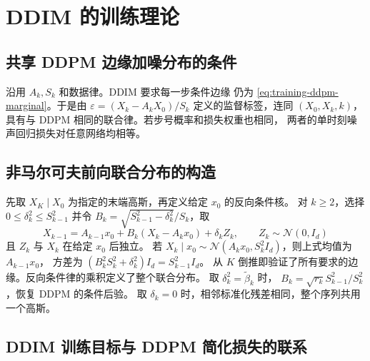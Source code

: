 \section{DDIM 的训练理论}
\label{sec:training-ddim}

\subsection{共享 DDPM 边缘加噪分布的条件}

沿用 \(A_k,S_k\) 和数据律。DDIM \cite{song2021ddim} 要求每一步条件边缘
仍为 \eqref{eq:training-ddpm-marginal}。于是由
\(\varepsilon=(X_k-A_kX_0)/S_k\) 定义的监督标签，连同
\((X_0,X_k,k)\)，具有与 DDPM 相同的联合律。若步号概率和损失权重也相同，
两者的单时刻噪声回归损失对任意网络均相等。

\subsection{非马尔可夫前向联合分布的构造}

先取 \(X_K\mid X_0\) 为指定的末端高斯，再定义给定 \(x_0\) 的反向条件核。
对 \(k\ge2\)，选择 \(0\le\delta_k^2\le S_{k-1}^2\) 并令
\(B_k=\sqrt{S_{k-1}^2-\delta_k^2}/S_k\)，取
\begin{equation}
  X_{k-1}=A_{k-1}x_0+B_k(X_k-A_kx_0)+\delta_k Z_k,
  \qquad Z_k\sim\mathcal N(0,I_d)
  \label{eq:training-ddim-kernel}
\end{equation}
且 \(Z_k\) 与 \(X_k\) 在给定 \(x_0\) 后独立。
若 \(X_k\mid x_0\sim\mathcal N(A_kx_0,S_k^2I_d)\)，则上式均值为 \(A_{k-1}x_0\)，
方差为 \((B_k^2 S_k^2+\delta_k^2)I_d=S_{k-1}^2I_d\)。
从 \(K\) 倒推即验证了所有要求的边缘。反向条件律的乘积定义了整个联合分布。
取 \(\delta_k^2=\widetilde\beta_k\) 时，
\(B_k=\sqrt{r_k}S_{k-1}^2/S_k^2\)，恢复 DDPM 的条件后验。
取 \(\delta_k=0\) 时，相邻标准化残差相同，整个序列共用一个高斯。

\subsection{DDIM 训练目标与 DDPM 简化损失的联系}

